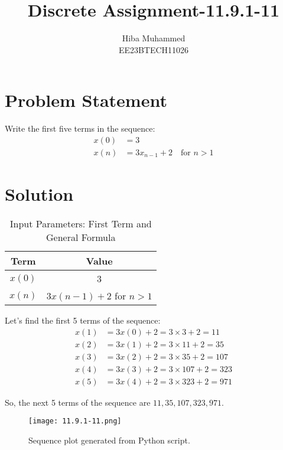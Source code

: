 \documentclass[12pt]{article}
\begin{document}
\title{Discrete Assignment-11.9.1-11}
\author{Hiba Muhammed \\
        EE23BTECH11026}
\maketitle

\section*{Problem Statement}
Write the first five terms in the sequence:
\[
\begin{aligned}
x(0)  &= 3 \\
x(n)  &= 3x_{n-1} + 2 \quad \text{for } n > 1
\end{aligned}
\]

\section*{Solution}
\begin{table}[h]
  \centering
  \caption{Input Parameters: First Term and General Formula}
  \begin{tabular}{|c|c|}
    \hline
    \textbf{Term} & \textbf{Value} \\
    \hline
    \(x(0) \) & 3 \\
    \(x(n)\) & \(3x(n-1) + 2\) for \(n > 1\) \\
    \hline
  \end{tabular}
\end{table}
Let's find the first 5 terms of the sequence:
\begin{align}
x(1) &= 3x(0)  + 2 = 3 \times 3 + 2 = 11 \\x(2) &= 3x(1) + 2 = 3 \times 11 + 2 = 35 \\
x(3) &= 3x(2) + 2 = 3 \times 35 + 2 = 107 \\x(4) &= 3x(3) + 2 = 3 \times 107 + 2 = 323 \\
x(5) &= 3x(4) + 2 = 3 \times 323 + 2 = 971 
\end{align}

So, the next 5 terms of the sequence are \(11, 35, 107, 323, 971\).
\begin{figure}[h]
    \centering
    \texttt{[image: 11.9.1-11.png]}
    \caption{Sequence plot generated from Python script.}
    \label{fig:sequence-plot}
\end{figure}
\end{document}
